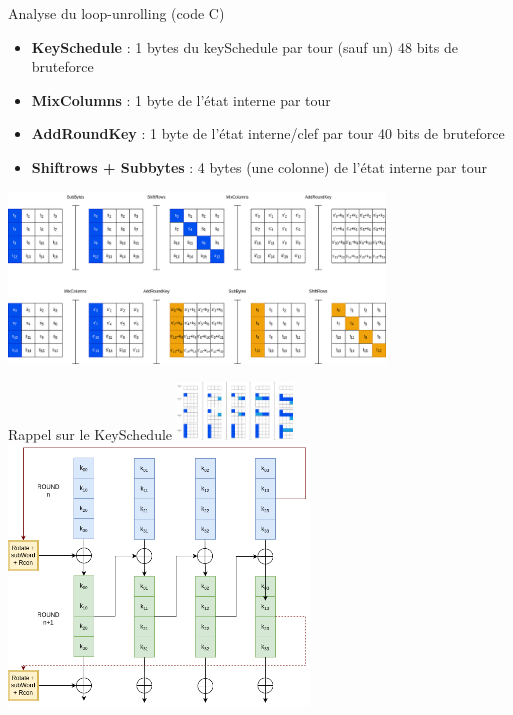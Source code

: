 \begin{frame}{Analyse du loop-unrolling (code C)}
    \begin{itemize}
        \item \textbf{KeySchedule} : 1 bytes du keySchedule par tour  (sauf un) \hfill 48 bits de bruteforce 
        
        \pause
        
        \item \textbf{MixColumns} : 1 byte de l'état interne par tour
        \item \textbf{AddRoundKey} : 1 byte de l'état interne/clef par tour \hfill  40 bits de bruteforce

        \pause
        
        \item \textbf{Shiftrows + Subbytes} : 4 bytes (une colonne) de l'état interne par tour
    \end{itemize}
    
    \pause

    \center
    \includegraphics[width=0.75\textwidth]{img/sca/aes-distrace/attack_sbsr.png}

\end{frame}

\begin{frame}{Rappel sur le KeySchedule}
    \centering
    \includegraphics[width=0.23\textwidth,clip,trim=0 0 1070 0]{img/sca/aes-distrace/full_recovery.png}
    \pause
    \hspace{0.5cm}
    \raisebox{0.4cm}{\rule{0.4pt}{7cm}}
    \hspace{0.4cm}
    \hspace{0.5cm}
    \includegraphics[width=0.6\textwidth]{img/sca/aes-distrace/keysched.png}
\end{frame}

